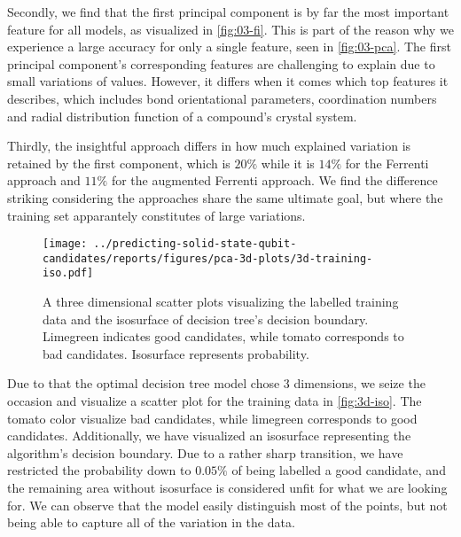 Secondly, we find that the first principal component is by far the most important feature for all models, as visualized in \autoref{fig:03-fi}. This is part of the reason why we experience a large accuracy for only a single feature, seen in \autoref{fig:03-pca}. The first principal component's corresponding features are challenging to explain due to small variations of values. However, it differs when it comes which top features it describes, which includes bond orientational parameters, coordination numbers and radial distribution function of a compound's crystal system.

Thirdly, the insightful approach differs in how much explained variation is retained by the first component, which is $20\%$ while it is $14\%$ for the Ferrenti approach and $11\%$ for the augmented Ferrenti approach. We find the difference striking considering the approaches share the same ultimate goal, but where the training set apparantely constitutes of large variations.

\begin{figure}[h!]
    \centering
    \texttt{[image: ../predicting-solid-state-qubit-candidates/reports/figures/pca-3d-plots/3d-training-iso.pdf]}
  \vspace*{-135mm}
  \caption{A three dimensional scatter plots visualizing the labelled training data and the isosurface of decision tree's decision boundary. Limegreen indicates good candidates, while tomato corresponds to bad candidates. Isosurface represents probability.}
  \label{fig:3d-iso}
\end{figure}

Due to that the optimal decision tree model chose $3$ dimensions, we seize the occasion and visualize a scatter plot for the training data in \autoref{fig:3d-iso}. The tomato color visualize bad candidates, while limegreen corresponds to good candidates. Additionally, we have visualized an isosurface representing the algorithm's decision boundary. Due to a rather sharp transition, we have restricted the probability down to $0.05\%$ of being labelled a good candidate, and the remaining area without isosurface is considered unfit for what we are looking for. We can observe that the model easily distinguish most of the points, but not being able to capture all of the variation in the data.

